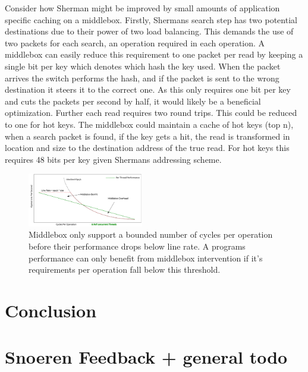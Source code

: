 Consider how Sherman might be improved by small amounts of application specific
caching on a middlebox. Firstly, Shermans search step has two potential
destinations due to their power of two load balancing. This demands the use of
two packets for each search, an operation required in each operation. A
middlebox can easily reduce this requirement to one packet per read by keeping a
single bit per key which denotes which hash the key used. When the packet
arrives the switch performs the hash, and if the packet is sent to the wrong
destination it steers it to the correct one. As this only requires one bit per
key and cuts the packets per second by half, it would likely be a beneficial
optimization. Further each read requires two round trips. This could be reduced
to one for hot keys. The middlebox could maintain a cache of hot keys (top n),
when a search packet is found, if the key gets a hit, the read is transformed in
location and size to the destination address of the true read. For hot keys this
requires 48 bits per key given Shermans addressing scheme.

\begin{figure}
    \includegraphics[width=0.45\textwidth]{fig/middlebox_model.png}

    \caption{Middlebox only support a bounded number of cycles per operation
    before their performance drops below line rate. A programs performance can
    only benefit from middlebox intervention if it's requirements per operation
    fall below this threshold.}

    \label{fig:middlebox_model}
\end{figure}

\section{Conclusion}

\section{Snoeren Feedback + general todo}

